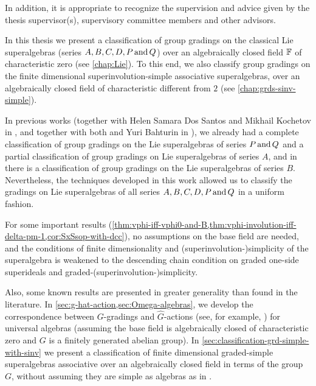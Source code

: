\begin{prefatory}
\noindent
In addition, it is appropriate to recognize the supervision and advice
given by the thesis supervisor(s), supervisory committee members and
other advisors.
\contribution%

In this thesis we present a classification of group gradings on the classical Lie superalgebras (series $A, B, C, D, P \,\text{and}\, Q$) over an algebraically closed field $\mathbb{F}$ of characteristic zero (see \cref{chap:Lie}). 
To this end, we also classify group gradings on the finite dimensional superinvolution-simple associative superalgebras, over an algebraically closed field of characteristic different from $2$ (see \cref{chap:grds-sinv-simple}). 

\noindent
In previous works (together with Helen Samara Dos Santos and Mikhail Kochetov in \cite{paper-MAP}, and together with both and Yuri Bahturin in \cite{paper-Qn}), we already had a complete classification of group gradings on the Lie superalgebras of series $P \,\text{and}\, Q$ and a partial classification of group gradings on Lie superalgebras of series $A$, and in \cite{Helens_thesis} there is a classification of group gradings on the Lie superalgebras of series $B$. 
Nevertheless, the techniques developed in this work allowed us to classify the gradings on Lie superalgebras of all series  $A, B, C, D, P \,\text{and}\, Q$ in a uniform fashion. 

\noindent 
For some important results (\cref{thm:vphi-iff-vphi0-and-B,thm:vphi-involution-iff-delta-pm-1,cor:SxSsop-with-dcc}), no assumptions on the base field are needed, and the conditions of finite dimensionality and (superinvolution-)simplicity of the superalgebra is weakened to the descending chain condition on graded one-side superideals and graded-(superinvolution-)simplicity. 

\noindent
Also, some known results are presented in greater generality than found in the literature. 
In \cref{sec:g-hat-action,sec:Omega-algebras}, we develop the correspondence between $G$-gradings and $\widehat G$-actions (see, for example, \cite[Section 1.4]{livromicha}) for universal algebras (assuming the base field is algebraically closed of characteristic zero and $G$ is a finitely generated abelian group). 
In \cref{sec:classification-grd-simple-with-sinv} we present a classification of finite dimensional graded-simple superalgebras associative over an algebraically closed field in terms of the group $G$, without assuming they are simple as algebras as in \cite{paper-MAP}. 




\end{prefatory}
